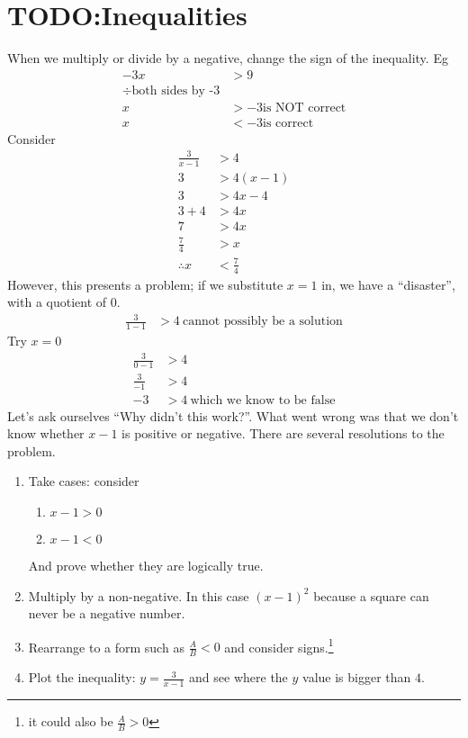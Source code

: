 \chapter{TODO:Inequalities}
\label{chap:Inequalities}
When we multiply or divide by a negative, change the sign of the inequality.
Eg
\begin{align}
  -3x & > 9 \\
  \div \text{both sides by -3} \nonumber \\
  x & > -3 \text{is NOT correct} \nonumber \\
  x & < -3 \text{is correct}
\end{align}
Consider
\begin{align}
  \frac{3}{x-1} & > 4 \\
  3 & > 4(x-1) \\
  3 & > 4x - 4 \\
  3 + 4 & > 4x \\
  7 & > 4x \\
  \frac{7}{4} & > x \\
  \therefore x & < \frac{7}{4}
\end{align}
However, this presents a problem; if we substitute $x=1$ in, we have a
``disaster'', with a quotient of $0$.
\begin{align}
  \frac{3}{1 - 1} & > 4~\text{cannot possibly be a solution}
\end{align}
Try $x=0$
\begin{align}
  \frac{3}{0 - 1} & > 4 \\
  \frac{3}{-1} & > 4 \\
  -3 & > 4~\text{which we know to be false}
\end{align}
Let's ask ourselves ``Why didn't this work?''. What went wrong was that we don't
know whether $x-1$ is positive or negative. There are several resolutions to the
problem.
\begin{enumerate}
  \item Take cases: consider
  \begin{enumerate}
    \item $x-1 > 0$
    \item $x-1 < 0$
  \end{enumerate}
  And prove whether they are logically true.
  \item Multiply by a non-negative. In this case $(x-1)^2$ because a square can
  never be a negative number.
  \item Rearrange to a form such as $\frac{A}{B} < 0$ and consider
  signs.\footnote{it could also be $\frac{A}{B} > 0$}
  \item Plot the inequality: $y = \frac{3}{x-1}$ and see where the $y$ value is
  bigger than $4$.
\end{enumerate}

